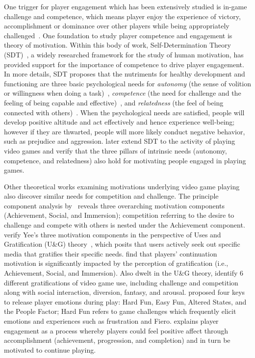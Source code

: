 One trigger for player engagement which has been extensively studied is in-game challenge and competence, which means player enjoy the experience of victory, accomplishment or dominance over other players while being appropriately challenged~\cite{ryan2006motivational,przybylski2010motivational,yee2006motivations,wu2010falling,sherry2006video,lazzaro2004we,schoenau2011player}. One foundation to study player competence and engagement is theory of motivation. Within this body of work, Self-Determination Theory (SDT)~\cite{ryan2000self}, a widely researched framework for the study of human motivation, has provided support for the importance of competence to drive player engagement. In more details, SDT proposes that the nutriments for healthy development and functioning are three basic psychological needs for \textit{autonomy} (the sense of volition or willingness when doing a task)~\cite{deci2000and,deci1964empirical}, \textit{competence} (the need for challenge and the feeling of being capable and effective)~\cite{white1959motivation,deci1985intrinsic}, and \textit{relatedness} (the feel of being connected with others)~\cite{ryan2001happiness,la2000within}. When the psychological needs are satisfied, people will develop positive altitude and act effectively and hence experience well-being; however if they are thwarted, people will more likely conduct negative behavior, such as prejudice and aggression. \cite{ryan2006motivational,przybylski2010motivational} later extend SDT to the activity of playing video games and verify that the three pillars of intrinsic needs (autonomy, competence, and relatedness) also hold for motivating people engaged in playing games. 

Other theoretical works examining motivations underlying video game playing also discover similar needs for competition and challenge. The principle component analysis by~\cite{yee2006motivations} reveals three overarching motivation components (Achievement, Social, and Immersion); competition referring to the desire to challenge and compete with others is nested under the Achievement component. \cite{wu2010falling} verify Yee's three motivation components in the perspective of Uses and Gratification (U\&G) theory~\cite{palmgreen1985uses}, which posits that users actively seek out specific media that gratifies their specific needs. \cite{wu2010falling} find that players' continuation motivation is significantly impacted by the perception of gratification (i.e., Achievement, Social, and Immersion). Also dwelt in the U\&G theory, \cite{sherry2006video} identify 6 different gratifications of video game use, including challenge and competition along with social interaction, diversion, fantasy, and arousal. \cite{lazzaro2004we} proposed four keys to release player emotions during play: Hard Fun, Easy Fun, Altered States, and the People Factor; Hard Fun refers to game challenges which frequently elicit emotions and experiences such as frustration and Fiero. \cite{schoenau2011player} explains player engagement as a process whereby players could feel positive affect through accomplishment (achievement, progression, and completion) and in turn be motivated to continue playing.  

